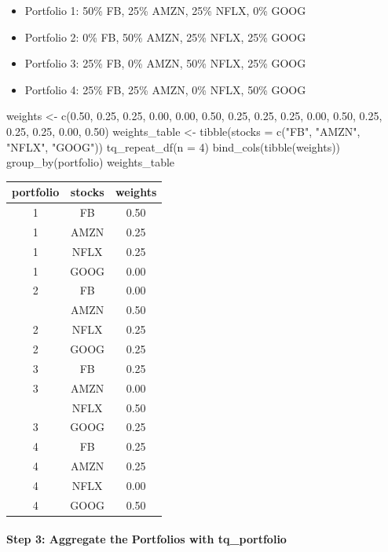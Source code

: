 \begin{itemize}
\tightlist
\item
  Portfolio 1: 50\% FB, 25\% AMZN, 25\% NFLX, 0\% GOOG
\item
  Portfolio 2: 0\% FB, 50\% AMZN, 25\% NFLX, 25\% GOOG
\item
  Portfolio 3: 25\% FB, 0\% AMZN, 50\% NFLX, 25\% GOOG
\item
  Portfolio 4: 25\% FB, 25\% AMZN, 0\% NFLX, 50\% GOOG
\end{itemize}

\begin{Schunk}
\begin{Sinput}
weights <- c(0.50, 0.25, 0.25, 0.00,
             0.00, 0.50, 0.25, 0.25,
             0.25, 0.00, 0.50, 0.25, 
             0.25, 0.25, 0.00, 0.50)
weights_table <- tibble(stocks = c("FB", "AMZN", "NFLX", "GOOG")) %
    tq_repeat_df(n = 4) %
    bind_cols(tibble(weights)) %
    group_by(portfolio)
weights_table
\end{Sinput}
\end{Schunk}

\begin{tabular}{ccc}
\toprule
portfolio & stocks & weights\\
\midrule
1 & FB & 0.50\\
1 & AMZN & 0.25\\
1 & NFLX & 0.25\\
1 & GOOG & 0.00\\
2 & FB & 0.00\\
\addlinespace
2 & AMZN & 0.50\\
2 & NFLX & 0.25\\
2 & GOOG & 0.25\\
3 & FB & 0.25\\
3 & AMZN & 0.00\\
\addlinespace
3 & NFLX & 0.50\\
3 & GOOG & 0.25\\
4 & FB & 0.25\\
4 & AMZN & 0.25\\
4 & NFLX & 0.00\\
4 & GOOG & 0.50\\
\bottomrule
\end{tabular}

\hspace{20 mm}

\paragraph{Step 3: Aggregate the Portfolios with
tq\_portfolio}\label{step-3-aggregate-the-portfolios-with-tq_portfolio}

